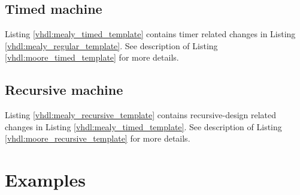 \subsection{Timed machine}
Listing \ref{vhdl:mealy_timed_template} contains timer related changes in Listing \ref{vhdl:mealy_regular_template}. See description of Listing \ref{vhdl:moore_timed_template} for more details. 




\subsection{Recursive machine}

Listing \ref{vhdl:mealy_recursive_template} contains recursive-design related changes in Listing \ref{vhdl:mealy_timed_template}. See description of Listing \ref{vhdl:moore_recursive_template} for more details. 



\section{Examples} \label{sec:VHDLtemplateExample}

